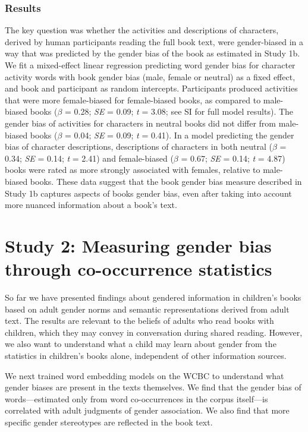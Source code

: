 \documentclass[
  english,
  ,man,floatsintext]{apa6}
\begin{document}
\hypertarget{results-1}{%
\subsubsection{Results}\label{results-1}}

The key question was whether the activities and descriptions of characters, derived by human participants reading the full book text, were gender-biased in a way that was predicted by the gender bias of the book as estimated in Study 1b. We fit a mixed-effect linear regression predicting word gender bias for character activity words with book gender bias (male, female or neutral) as a fixed effect, and book and participant as random intercepts. Participants produced activities that were more female-biased for female-biased books, as compared to male-biased books (\(\beta\) = 0.28; \emph{SE} = 0.09; \emph{t} = 3.08; see SI for full model results). The gender bias of activities for characters in neutral books did not differ from male-biased books (\(\beta\) = 0.04; \emph{SE} = 0.09; \emph{t} = 0.41). In a model predicting the gender bias of character descriptions, descriptions of characters in both neutral (\(\beta\) = 0.34; \emph{SE} = 0.14; \emph{t} = 2.41) and female-biased (\(\beta\) = 0.67; \emph{SE} = 0.14; \emph{t} = 4.87) books were rated as more strongly associated with females, relative to male-biased books. These data suggest that the book gender bias measure described in Study 1b captures aspects of books gender bias, even after taking into account more nuanced information about a book's text.

\hypertarget{study-2-measuring-gender-bias-through-co-occurrence-statistics}{%
\section{Study 2: Measuring gender bias through co-occurrence statistics}\label{study-2-measuring-gender-bias-through-co-occurrence-statistics}}

So far we have presented findings about gendered information in children's books based on adult gender norms and semantic representations derived from adult text. The results are relevant to the beliefs of adults who read books with children, which they may convey in conversation during shared reading. However, we also want to understand what a child may learn about gender from the statistics in children's books alone, independent of other information sources.

We next trained word embedding models on the WCBC to understand what gender biases are present in the texts themselves. We find that the gender bias of words---estimated only from word co-occurrences in the corpus itself---is correlated with adult judgments of gender association. We also find that more specific gender stereotypes are reflected in the book text.
\end{document}
